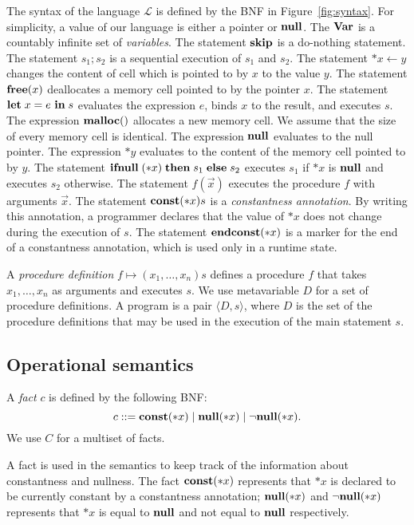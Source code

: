 
The syntax of the language \(\mathcal{L}\) is defined by the BNF in
Figure~\ref{fig:syntax}.  For simplicity, a value of our language is
either a pointer or $\mathbf{null}$.  The \(\mathbf{Var}\) is a countably infinite set
of \emph{variables}. The statement \(\mathbf{skip}\) is a do-nothing statement.
The statement \(s_1;s_2\) is a sequential execution of \(s_1\) and
\(s_2\). The statement \(*x \leftarrow y\) changes the content of cell
which is pointed to by \(x\) to the value \(y\). The statement
\(\mathbf{free}(x)\) deallocates a memory cell pointed to by the pointer
\(x\). The statement \(\mathbf{let}\; x = e\ \mathbf{in}\; s\) evaluates the expression
\(e\), binds \(x\) to the result, and executes \(s\).  The expression
\(\mathbf{malloc}()\) allocates a new memory cell.  We assume that the size of
every memory cell is identical.  The expression \(\mathbf{null}\) evaluates to
the null pointer.  The expression $*y$ evaluates to the content of the
memory cell pointed to by \(y\).  The statement \(\mathbf{ifnull}\;(*x) \; \mathbf{then}\;
s_1 \; \mathbf{else}\; s_2\) executes \(s_1\) if \(*x\) is \(\mathbf{null}\) and executes
\(s_2\) otherwise. The statement \(f(\vec{x})\) executes the procedure
\(f\) with arguments \(\vec{x}\).  The statement \(\mathbf{const}(*x) s\) is a
\emph{constantness annotation}.  By writing this annotation, a
programmer declares that the value of $*x$ does not change during the
execution of $s$.  The statement \(\mathbf{endconst}(*x)\) is a marker for the end
of a constantness annotation, which is used only in a runtime state.

A \emph{procedure definition} $f \mapsto (x_1,\dots,x_n)s$ defines a
procedure $f$ that takes $x_1,\dots,x_n$ as arguments and executes $s$.
We use metavariable \(D\) for a set of procedure definitions.  A program
is a pair \(\langle D, s \rangle \), where \(D\) is the set of the
procedure definitions that may be used in the execution of the main
statement $s$.

\subsection{Operational semantics}
\label{sec:languageSemantics}

\begin{myDef}
 A \emph{fact} $c$ is defined by the following BNF:
 \[
 c ::= \mathbf{const}(*x) \mid \mathbf{null}(*x) \mid \neg\mathbf{null}(*x).
 \]
 We use $C$ for a multiset of facts.
\end{myDef}
A fact is used in the semantics to keep track of the information about
constantness and nullness.  The fact \(\mathbf{const}(*x)\) represents that $*x$
is declared to be currently constant by a constantness annotation;
\(\mathbf{null}(*x)\) and \(\neg\mathbf{null}(*x)\) represents that $*x$ is equal to $\mathbf{null}$ and
not equal to $\mathbf{null}$ respectively.

